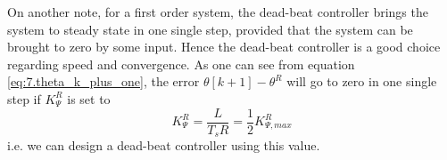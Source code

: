 On another note, for a first order system, the dead-beat controller brings the
system to steady state in one single step, provided that the system can be
brought to zero by some input. Hence the dead-beat controller is a good choice
regarding speed and convergence. As one can see from equation
\ref{eq:7.theta_k_plus_one}, the error $\theta[k+1] - \theta^R$ will go to zero
in one single step if $K_\Psi ^R$ is set to
$$K_\Psi ^R = \frac{L}{T_s R} = \frac{1}{2}K_{\Psi,max}^R$$
i.e. we can design a dead-beat controller using this value.
